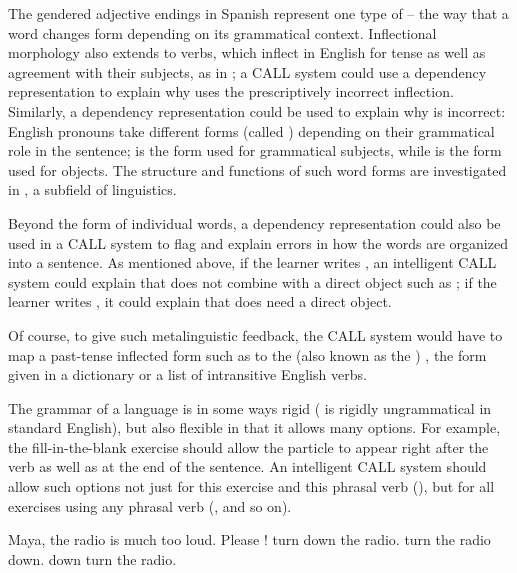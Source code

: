 The gendered adjective endings in Spanish represent one type of  -- the way that a word changes form depending on its grammatical context.  Inflectional morphology also extends to verbs, which inflect in English for tense as well as agreement with their subjects, as in ; a CALL system could use a dependency representation to explain why  uses the prescriptively incorrect inflection.  Similarly, a dependency representation could be used to explain why  is incorrect: English pronouns take different forms (called ) depending on their grammatical role in the sentence;  is the  form used for grammatical subjects, while  is the  form used for objects.  The structure and functions of such word forms are investigated in , a subfield of linguistics. 

Beyond the form of individual words, a dependency representation could also be used in a CALL system to flag and explain errors in how the words are organized into a sentence.  As mentioned above,  if the learner writes  , an intelligent CALL system could explain that  does not combine with a direct object such as ; if the learner writes , it could explain that  does need a direct object. 

Of course, to give such metalinguistic feedback, the CALL system would have to map a past-tense inflected form such as  to the  (also known as the ) , the form given in a dictionary or a list of intransitive English verbs. 


The grammar of a language is in some ways rigid ( is rigidly ungrammatical in standard English), but also flexible in that it allows many options.  For example, the fill-in-the-blank exercise  should allow the particle  to appear right after the verb as well as at the end of the sentence.  An intelligent CALL system should allow such options not just for this exercise and this phrasal verb (), but for all exercises using any phrasal verb (, and so on).

\ea  \label{ex:fib-phrasal-verb} Maya, the radio is much too
  loud. Please \uline{\hspace{3cm}}!  
    \ea  turn down the radio. 
    \ex turn the radio down.
     \ex *down turn the radio.
    \z
    \z 



